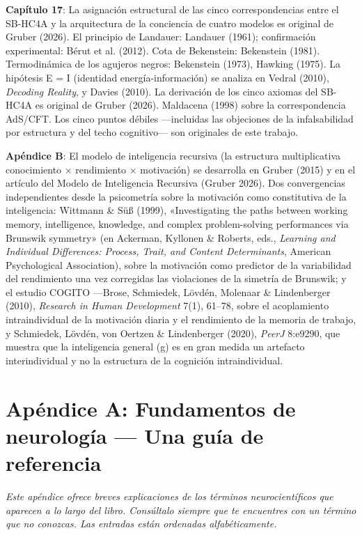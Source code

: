 \documentclass[11pt, twoside, openright]{book}
\begin{document}
\textbf{Capítulo 17}: La asignación estructural de las cinco correspondencias entre el SB-HC4A y la arquitectura de la conciencia de cuatro modelos es original de Gruber (2026). El principio de Landauer: Landauer (1961); confirmación experimental: Bérut et al. (2012). Cota de Bekenstein: Bekenstein (1981). Termodinámica de los agujeros negros: Bekenstein (1973), Hawking (1975). La hipótesis E = I (identidad energía-información) se analiza en Vedral (2010), \textit{Decoding Reality}, y Davies (2010). La derivación de los cinco axiomas del SB-HC4A es original de Gruber (2026). Maldacena (1998) sobre la correspondencia AdS/\allowbreak{}CFT. Los cinco puntos débiles ---incluidas las objeciones de la infalsabilidad por estructura y del techo cognitivo--- son originales de este trabajo.

\textbf{Apéndice B}: El modelo de inteligencia recursiva (la estructura multiplicativa conocimiento × rendimiento × motivación) se desarrolla en Gruber (2015) y en el artículo del Modelo de Inteligencia Recursiva (Gruber 2026). Dos convergencias independientes desde la psicometría sobre la motivación como constitutiva de la inteligencia: Wittmann \& Süß (1999), «Investigating the paths between working memory, intelligence, knowledge, and complex problem-solving performances via Brunswik symmetry» (en Ackerman, Kyllonen \& Roberts, eds., \textit{Learning and Individual Differences: Process, Trait, and Content Determinants}, American Psychological Association), sobre la motivación como predictor de la variabilidad del rendimiento una vez corregidas las violaciones de la simetría de Brunswik; y el estudio COGITO ---Brose, Schmiedek, Lövdén, Molenaar \& Lindenberger (2010), \textit{Research in Human Development} 7(1), 61--78, sobre el acoplamiento intraindividual de la motivación diaria y el rendimiento de la memoria de trabajo, y Schmiedek, Lövdén, von Oertzen \& Lindenberger (2020), \textit{PeerJ} 8:e9290, que muestra que la inteligencia general (g) es en gran medida un artefacto interindividual y no la estructura de la cognición intraindividual.


\chapter*{Apéndice A: Fundamentos de neurología --- Una guía de referencia}

\textit{Este apéndice ofrece breves explicaciones de los términos neurocientíficos que aparecen a lo largo del libro. Consúltalo siempre que te encuentres con un término que no conozcas. Las entradas están ordenadas alfabéticamente.}
\end{document}
